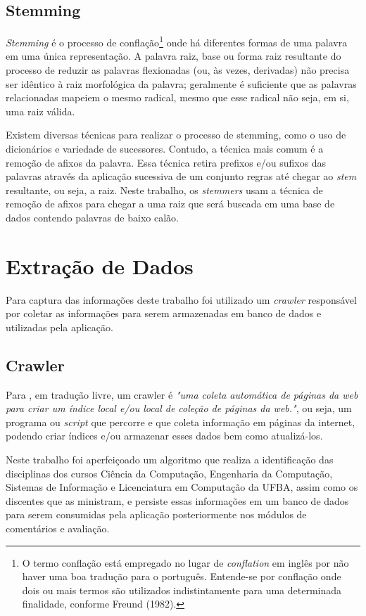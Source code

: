 \documentclass[12pt, a4paper]{report}
\begin{document}
\subsection{Stemming}
 \emph{Stemming} é o processo de conflação\footnote{O termo conflação está empregado no lugar de \emph{conflation} em inglês por não haver uma boa tradução para o português. Entende-se por conflação onde dois ou mais termos são utilizados indistintamente para uma determinada finalidade, conforme Freund (1982).} onde há diferentes formas de uma palavra em uma única representação.
A palavra raiz, base ou forma raiz resultante do processo de reduzir as palavras flexionadas (ou, às vezes, derivadas) não precisa ser idêntico à raiz morfológica da palavra; geralmente é suficiente que as palavras relacionadas mapeiem o mesmo radical, mesmo que esse radical não seja, em si, uma raiz válida.

Existem diversas técnicas para realizar o processo de stemming, como o uso de dicionários e variedade de sucessores. Contudo, a técnica mais comum é a remoção de afixos da palavra. Essa técnica retira prefixos e/ou sufixos das palavras através da aplicação sucessiva de um conjunto regras até chegar ao \emph{stem} resultante, ou seja, a raiz. Neste trabalho, os \emph{stemmers} usam a técnica de remoção de afixos para chegar a uma raiz que será buscada em uma base de dados contendo palavras de baixo calão.   

\section{Extração de Dados}
Para captura das informações deste trabalho foi utilizado um \textit{crawler} responsável por coletar as informações para serem armazenadas em banco de dados e utilizadas pela aplicação.

\subsection{Crawler}
Para \cite[p. 1]{ilprints376}, em tradução livre, um crawler é \textit{"uma coleta automática de páginas da web para criar um índice local e/ou local de coleção de páginas da web."}, ou seja, um programa ou \textit{script} que percorre e que coleta informação em páginas da internet, podendo criar índices e/ou armazenar esses dados bem como atualizá-los. 

Neste trabalho foi aperfeiçoado um algoritmo que realiza  a identificação das disciplinas dos cursos Ciência da Computação, Engenharia da Computação, Sistemas de Informação e Licenciatura em Computação da UFBA, assim como os discentes que as ministram, e persiste essas informações em um banco de dados para serem consumidas pela aplicação posteriormente nos módulos de comentários e avaliação.
\end{document}
